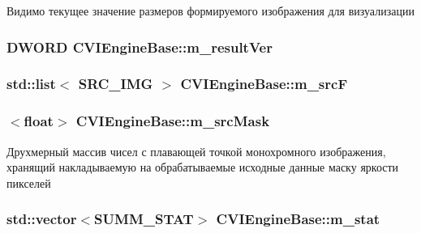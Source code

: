 Видимо текущее значение размеров формируемого изображения для визуализации 

\hypertarget{class_c_v_i_engine_base_a756c886b931c2c905085558d219d4045}{
\subsubsection[{m\+\_\+result\+Ver}]{\setlength{\rightskip}{0pt plus 5cm}D\+W\+O\+R\+D C\+V\+I\+Engine\+Base\+::m\+\_\+result\+Ver}}\label{class_c_v_i_engine_base_a756c886b931c2c905085558d219d4045}




\hypertarget{class_c_v_i_engine_base_a67a15f389d32a0201997a71dc4695803}{
\subsubsection[{m\+\_\+src\+F}]{\setlength{\rightskip}{0pt plus 5cm}std\+::list$<$ S\+R\+C\+\_\+\+I\+M\+G $>$ C\+V\+I\+Engine\+Base\+::m\+\_\+src\+F}}\label{class_c_v_i_engine_base_a67a15f389d32a0201997a71dc4695803}




\hypertarget{class_c_v_i_engine_base_a0b3b91816e3f19ec5e531c5ad903be98}{
\subsubsection[{m\+\_\+src\+Mask}]{$<$float$>$ C\+V\+I\+Engine\+Base\+::m\+\_\+src\+Mask}}\label{class_c_v_i_engine_base_a0b3b91816e3f19ec5e531c5ad903be98}


Друхмерный массив чисел с плавающей точкой монохромного изображения, хранящий накладываемую на обрабатываемые исходные данные маску яркости пикселей 

\hypertarget{class_c_v_i_engine_base_a73ff2aaa9eeb589ce6ea73ef5dd62fda}{
\subsubsection[{m\+\_\+stat}]{\setlength{\rightskip}{0pt plus 5cm}std\+::vector$<${\bf S\+U\+M\+M\+\_\+\+S\+T\+A\+T}$>$ C\+V\+I\+Engine\+Base\+::m\+\_\+stat}}\label{class_c_v_i_engine_base_a73ff2aaa9eeb589ce6ea73ef5dd62fda}


